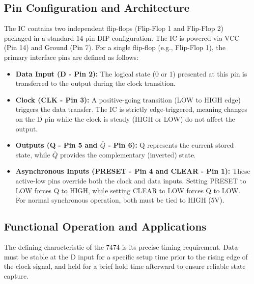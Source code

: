 \documentclass[12pt, a4paper]{report}
\begin{document}
\subsection{Pin Configuration and Architecture}
The IC contains two independent flip-flops (Flip-Flop 1 and Flip-Flop 2) packaged in a standard 14-pin DIP configuration. The IC is powered via VCC (Pin 14) and Ground (Pin 7). For a single flip-flop (e.g., Flip-Flop 1), the primary interface pins are defined as follows:
\begin{itemize}
    \item \textbf{Data Input (D - Pin 2):} The logical state (0 or 1) presented at this pin is transferred to the output during the clock transition.
    \item \textbf{Clock (CLK - Pin 3):} A positive-going transition (LOW to HIGH edge) triggers the data transfer. The IC is strictly edge-triggered, meaning changes on the D pin while the clock is steady (HIGH or LOW) do not affect the output.
    \item \textbf{Outputs (Q - Pin 5 and $\overline{Q}$ - Pin 6):} Q represents the current stored state, while $\overline{Q}$ provides the complementary (inverted) state.
    \item \textbf{Asynchronous Inputs (PRESET - Pin 4 and CLEAR - Pin 1):} These active-low pins override both the clock and data inputs. Setting PRESET to LOW forces Q to HIGH, while setting CLEAR to LOW forces Q to LOW. For normal synchronous operation, both must be tied to HIGH (5V).
\end{itemize}

\subsection{Functional Operation and Applications}
The defining characteristic of the 7474 is its precise timing requirement. Data must be stable at the D input for a specific setup time prior to the rising edge of the clock signal, and held for a brief hold time afterward to ensure reliable state capture.
\end{document}
